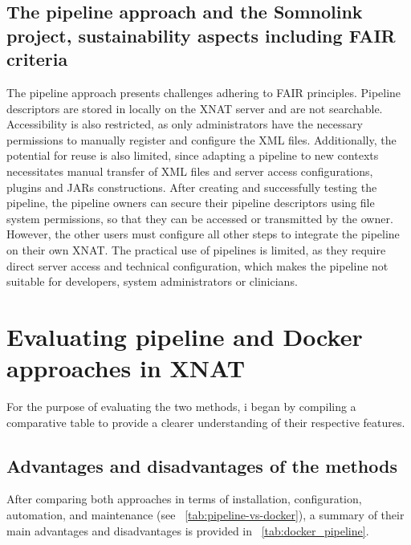 \subsection{The pipeline approach and the Somnolink project, sustainability aspects including FAIR criteria}
The pipeline approach presents challenges adhering to FAIR principles.
Pipeline descriptors are stored in locally on the XNAT server and are not searchable.
Accessibility is also restricted, as only administrators have the necessary permissions to manually register and configure the XML files.
Additionally, the potential for reuse is also limited, since adapting a pipeline to new contexts necessitates manual transfer of XML files and server access configurations, plugins and JARs constructions. 
After creating and successfully testing the pipeline, the pipeline owners can secure their pipeline descriptors using file system permissions, so that they can be accessed or transmitted by the owner. However, the other users must configure all other steps to integrate the pipeline on their own XNAT.
The practical use of pipelines is limited, as they require direct server access and technical configuration, which makes the pipeline not suitable for developers, system administrators or clinicians.


\section{Evaluating pipeline and Docker approaches in XNAT}

For the purpose of evaluating the two methods, i began by compiling a comparative table to provide a clearer understanding of their respective features.

\subsection{Advantages and disadvantages of the methods}

After comparing both approaches in terms of installation, configuration, automation, and maintenance (see ~\autoref{tab:pipeline-vs-docker}), a summary of their main advantages and disadvantages is provided in ~\autoref{tab:docker_pipeline}.

